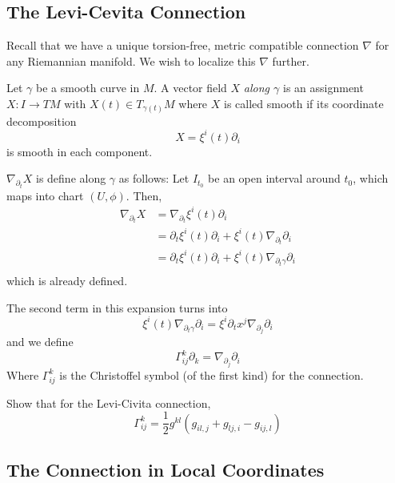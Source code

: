 \documentclass[../main.tex]{subfiles}
\begin{document}
\subsection{The Levi-Cevita Connection}
Recall that we have a unique torsion-free, metric compatible connection $\nabla$
for any Riemannian manifold. We wish to localize this $\nabla$ further.

\begin{defn}
    Let $\gamma$ be a smooth curve in $M$. A vector field $X$ {\em along
    $\gamma$} is an assignment $X:I\to TM$ with $X(t) \in T_{\gamma(t)}M$ where
    $X$ is called smooth if its coordinate decomposition
    \[
        X = \xi^i(t)\partial_i
    \]
    is smooth in each component.
\end{defn}

\begin{defn}
    $\nabla_{\partial_t}X$ is define along $\gamma$ as follows: Let $I_{t_0}$ be an open
    interval around $t_0$, which maps into chart $(U,\phi)$. Then,
    \[
        \begin{aligned}
            \nabla_{\partial_t}X &= \nabla_{\partial_t}\xi^i(t)\partial_i\\
                        &= \partial_t\xi^i(t)\partial_i +
                        \xi^i(t)\nabla_{\partial_t}\partial_i\\
                        &= \partial_t\xi^i(t)\partial_i +
                        \xi^i(t)\nabla_{\partial_t\gamma}\partial_i\\
        \end{aligned}
    \]
    which is already defined.
\end{defn}

The second term in this expansion turns into
\[
    \xi^i(t)\nabla_{\partial_t\gamma}\partial_i
    = \xi^i\partial_tx^j \nabla_{\partial_j}\partial_i
\]
and we define
\[
    \Gamma^k_{ij}\partial_k = \nabla_{\partial_j}\partial_i
\]
Where $\Gamma^k_{ij}$ is the Christoffel symbol (of the first kind) for the
connection.

\begin{hw}
    Show that for the Levi-Civita connection,
    \[
        \Gamma^k_{ij} = \frac{1}{2}g^{kl}(g_{il,j} + g_{lj,i} - g_{ij,l})
    \]
\end{hw}

\subsection{The Connection in Local Coordinates}
\end{document}
